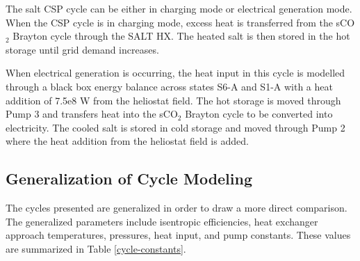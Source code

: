 \begin{paracol}{2}
\linenumbers
\switchcolumn

The salt CSP cycle can be either in charging mode or electrical generation mode. 
When the CSP cycle is in charging mode, excess heat is transferred from the sCO$_{2}$ Brayton cycle through the SALT HX. The heated salt is then stored in the hot storage until grid demand increases.   

When electrical generation is occurring, the heat input in this cycle is modelled through a black box energy balance across states S6-A and S1-A with a heat addition of 7.5e8 W from the heliostat field. The hot storage is moved through Pump 3 and transfers heat into the sCO$_{2}$ Brayton cycle to be converted into electricity. The cooled salt is stored in cold storage and moved through Pump 2 where the heat addition from the heliostat field is added.



\subsection{Generalization of Cycle Modeling}

The cycles presented are generalized in order to draw a more direct comparison. The generalized parameters include isentropic efficiencies, heat exchanger approach temperatures, pressures, heat input, and pump constants. These values are summarized in Table \ref{cycle-constants}.


\end{paracol}
